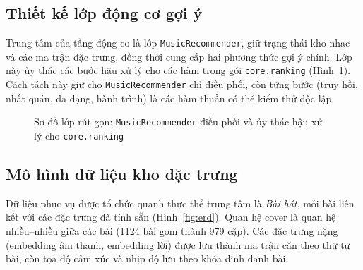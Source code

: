 \documentclass[../DoAn.tex]{subfiles}
\begin{document}
\subsection{Thiết kế lớp động cơ gợi ý}
\label{subsection:4.1.5}
Trung tâm của tầng động cơ là lớp \texttt{MusicRecommender}, giữ trạng thái kho nhạc và các ma trận đặc trưng, đồng thời cung cấp hai phương thức gợi ý chính. Lớp này ủy thác các bước hậu xử lý cho các hàm trong gói \texttt{core.ranking} (Hình~\ref{fig:class}). Cách tách này giữ cho \texttt{MusicRecommender} chỉ điều phối, còn từng bước (truy hồi, nhất quán, đa dạng, hành trình) là các hàm thuần có thể kiểm thử độc lập.

\begin{figure}[h!]
\centering
{}
\caption{Sơ đồ lớp rút gọn: \texttt{MusicRecommender} điều phối và ủy thác hậu xử lý cho \texttt{core.ranking}}
\label{fig:class}
\end{figure}

\subsection{Mô hình dữ liệu kho đặc trưng}
\label{subsection:4.1.6}
Dữ liệu phục vụ được tổ chức quanh thực thể trung tâm là \textit{Bài hát}, mỗi bài liên kết với các đặc trưng đã tính sẵn (Hình~\ref{fig:erd}). Quan hệ cover là quan hệ nhiều--nhiều giữa các bài (1124 bài gom thành 979 cặp). Các đặc trưng nặng (embedding âm thanh, embedding lời) được lưu thành ma trận căn theo thứ tự bài, còn tọa độ cảm xúc và nhịp độ lưu theo khóa định danh bài.
\end{document}
